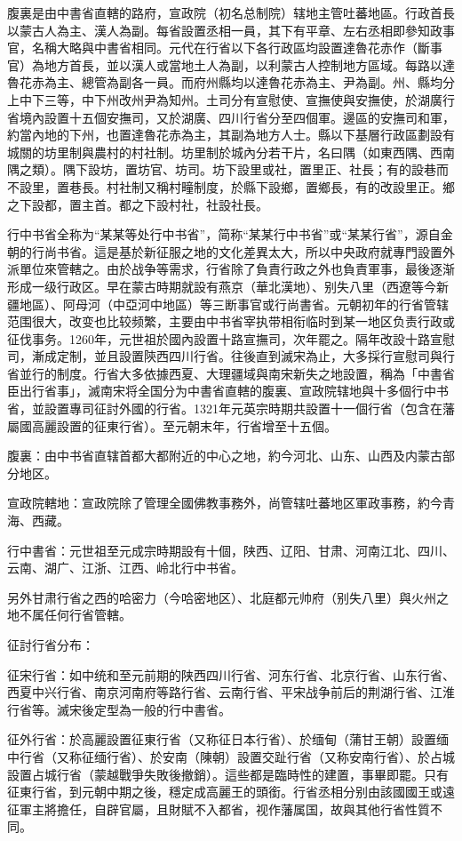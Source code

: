 腹裏是由中書省直轄的路府，宣政院（初名总制院）辖地主管吐蕃地區。行政首長以蒙古人為主、漢人為副。每省設置丞相一員，其下有平章、左右丞相即參知政事官，名稱大略與中書省相同。元代在行省以下各行政區均設置達魯花赤作（斷事官）為地方首長，並以漢人或當地土人為副，以利蒙古人控制地方區域。每路以達魯花赤為主、總管為副各一員。而府州縣均以達魯花赤為主、尹為副。州、縣均分上中下三等，中下州改州尹為知州。土司分有宣慰使、宣撫使與安撫使，於湖廣行省境內設置十五個安撫司，又於湖廣、四川行省分至四個軍。邊區的安撫司和軍，約當內地的下州，也置達魯花赤為主，其副為地方人士。縣以下基層行政區劃設有城關的坊里制與農村的村社制。坊里制於城內分若干片，名曰隅（如東西隅、西南隅之類）。隅下設坊，置坊官、坊司。坊下設里或社，置里正、社長；有的設巷而不設里，置巷長。村社制又稱村疃制度，於縣下設鄉，置鄉長，有的改設里正。鄉之下設都，置主首。都之下設村社，社設社長。

行中书省全称为“某某等处行中书省”，简称“某某行中书省”或“某某行省”，源自金朝的行尚书省。這是基於新征服之地的文化差異太大，所以中央政府就專門設置外派單位來管轄之。由於战争等需求，行省除了負責行政之外也負責軍事，最後逐渐形成一级行政区。早在蒙古時期就設有燕京（華北漢地）、别失八里（西遼等今新疆地區）、阿母河（中亞河中地區）等三断事官或行尚書省。元朝初年的行省管辖范围很大，改变也比较频繁，主要由中书省宰执带相衔临时到某一地区负责行政或征伐事务。1260年，元世祖於國內設置十路宣撫司，次年罷之。隔年改設十路宣慰司，漸成定制，並且設置陝西四川行省。往後直到滅宋為止，大多採行宣慰司與行省並行的制度。行省大多依據西夏、大理疆域與南宋新失之地設置，稱為「中書省臣出行省事」，滅南宋将全国分为中書省直轄的腹裏、宣政院辖地與十多個行中书省，並設置專司征討外國的行省。1321年元英宗時期共設置十一個行省（包含在藩屬國高麗設置的征東行省）。至元朝末年，行省增至十五個。

腹裏：由中书省直辖首都大都附近的中心之地，約今河北、山东、山西及内蒙古部分地区。

宣政院轄地：宣政院除了管理全國佛教事務外，尚管辖吐蕃地区軍政事務，約今青海、西藏。

行中書省：元世祖至元成宗時期設有十個，陕西、辽阳、甘肃、河南江北、四川、云南、湖广、江浙、江西、岭北行中书省。

另外甘肃行省之西的哈密力（今哈密地区）、北庭都元帅府（别失八里）與火州之地不属任何行省管轄。

征討行省分布：

征宋行省：如中统和至元前期的陕西四川行省、河东行省、北京行省、山东行省、西夏中兴行省、南京河南府等路行省、云南行省、平宋战争前后的荆湖行省、江淮行省等。滅宋後定型為一般的行中書省。

征外行省：於高麗設置征東行省（又称征日本行省）、於缅甸（蒲甘王朝）設置缅中行省（又称征缅行省）、於安南（陳朝）設置交趾行省（又称安南行省）、於占城設置占城行省（蒙越戰爭失敗後撤銷）。這些都是臨時性的建置，事畢即罷。只有征東行省，到元朝中期之後，穩定成高麗王的頭銜。行省丞相分别由該國國王或遠征軍主將擔任，自辟官屬，且財賦不入都省，视作藩属国，故與其他行省性質不同。

